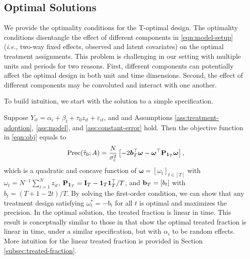  	

	{\blue 
 \subsection{Optimal Solutions}\label{subsec:result-carryover}
	We provide the optimality conditions for the T-optimal design. The optimality conditions disentangle the effect of different components in \eqref{eqn:model-setup} ({\it i.e.}, two-way fixed effects, observed and latent covariates) on the optimal treatment assignments. This problem is challenging in our setting with multiple units and periods for two reasons. First, different components can potentially affect the optimal design in both unit and time dimensions. Second, the effect of different components may be convoluted and interact with one another.
	
	To build intuition, we start with the solution to a simple specification.
	
	\begin{example}[Two-way fixed effects and $\ell = 0$]\label{example:two-way-fe}
	Suppose $Y_{it} = \alpha_i + \beta_t + \tau_0 z_{it} + \varepsilon_{it}$, and and Assumptions \ref{ass:treatment-adoption}, \ref{ass:model}, and \ref{ass:constant-error} hold. Then the objective function in \eqref{eqn:obj} equals to
\begin{align}\label{eqn:precision-ell-0}
      \mathrm{Prec}(\hat{\tau}_0; A)
    = \frac{N}{\sigma_\varepsilon^2 } \left[ - 2 \bm{b}_T^\top \bm{\omega} -\bm{\omega}^\top \mathbf{P}_{\bm{1}_{T}} \bm{\omega} \right],
\end{align}
which is a quadratic and concave function of $\bm{\omega} = [\omega_t]_{t \in [T]}$ with $\omega_t = N^{-1} \sum_{i=1}^N z_{it}$, $\mathbf{P}_{\bm{1}_{T}} = \mathbf{I}_{T} - \bm{1}_{T} \bm{1}_{T}^\top/T$, and $\mathbf{b}_T = [b_{t}]$ with $b_{t} = (T+1-2t)/T$. By solving the first-order condition, we can show that any treatment design satisfying
${\omega}^{\ast}_t = -b_t$ for all $t$ is optimal and maximizes the precision. In the optimal solution,  the treated fraction is linear in time. This result is conceptually similar to those in \cite{lawrie2015optimal,girling2016statistical,li2018optimal} that show the optimal treated fraction is linear in time, under a similar specification, but with $\alpha_i$ to be random effects. More intuition for the linear treated fraction is provided in Section \ref{subsec:treated-fraction}. 



	\end{example}
	
}
